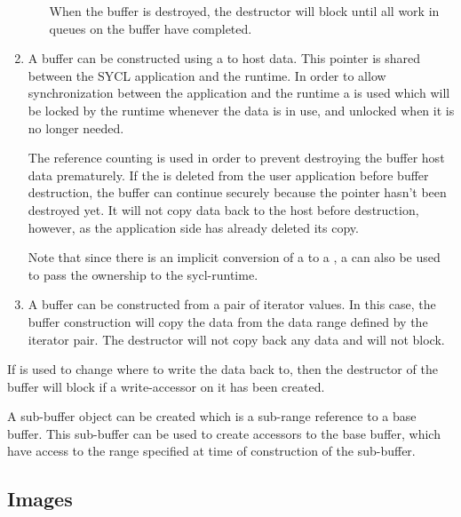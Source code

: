 \begin{enumerate}
\begin{enumerate}
    When the buffer is destroyed, the destructor will block until all
    work in queues on the buffer have completed.

  \end{enumerate}

  \item
    A buffer can be constructed using a  to host data.
    This pointer is shared between the SYCL application and the runtime. In order
    to allow synchronization between the application and the runtime a
     is used which will be locked by the runtime whenever the
    data is in use, and unlocked when it is no longer needed.

    The  reference counting is used in order to prevent
    destroying the buffer host data prematurely. If the
     is deleted from the user application before buffer
    destruction, the buffer can continue securely because the pointer
    hasn't been destroyed yet.  It will not copy data back to the host before destruction, however,
    as the application side has already deleted its copy.

    Note that since there is an implicit conversion of a
     to a , a
     can also be used to pass the
    ownership to the \gls{sycl-runtime}.

  \item
    A buffer can be constructed from a pair of iterator values. In
    this case, the buffer construction will copy the data from the
    data range defined by the iterator pair. The destructor will
    not copy back any data and will not block.
    
  \end{enumerate}

If  is used to change where to write the
data back to, then the destructor of the buffer will block if a
write-accessor on it has been created.

A sub-buffer object can be created which is a sub-range reference to a
base buffer. This sub-buffer can be used to create accessors to the
base buffer, which have access to the range specified at time
of construction of the sub-buffer.

\subsection{Images}
\label{subsec:images}


